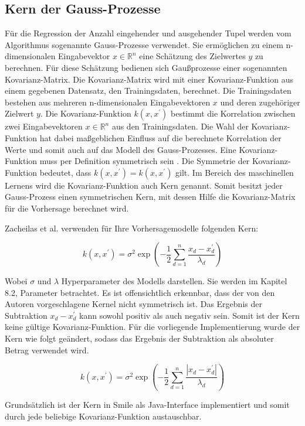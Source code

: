 \subsection{Kern der Gauss-Prozesse}
Für die Regression der Anzahl eingehender und ausgehender Tupel werden vom Algorithmus sogenannte Gauss-Prozesse verwendet.
Sie ermöglichen zu einem n-dimensionalen Eingabevektor \(x \in \mathbb{R}^n\) eine Schätzung des Zielwertes \(y\) zu berechnen.
Für diese Schätzung bedienen sich Gaußprozesse einer sogenannten Kovarianz-Matrix.
Die Kovarianz-Matrix wird mit einer Kovarianz-Funktion aus einem gegebenen Datensatz, den Trainingsdaten, berechnet.
Die Trainingsdaten bestehen aus mehreren n-dimensionalen Eingabevektoren \(x\) und deren zugehöriger Zielwert \(y\).
Die Kovarianz-Funktion \(k(x,x^\prime)\) bestimmt die Korrelation zwischen zwei Eingabevektoren \(x \in \mathbb{R}^n\) aus den Trainingsdaten.
Die Wahl der Kovarianz-Funktion hat dabei maßgeblichen Einfluss auf die berechnete Korrelation der Werte und somit auch auf das Modell des Gauss-Prozesses.
Eine Kovarianz-Funktion muss per Definition symmetrisch sein \cite{rasmussen2004gaussian}.
Die Symmetrie der Kovarianz-Funktion bedeutet, dass \(k(x,x^\prime) = k(x,x^\prime)\) gilt.
Im Bereich des maschinellen Lernens wird die Kovarianz-Funktion auch Kern genannt.
Somit besitzt jeder Gauss-Prozess einen symmetrischen Kern, mit dessen Hilfe die Kovarianz-Matrix für die Vorhersage berechnet wird.

Zacheilas et al. verwenden für Ihre Vorhersagemodelle folgenden Kern:

\[k(x, x^\prime) = \sigma^2 \exp{\left( - \frac{1}{2} \sum^{n}_{d=1} \frac{x_d-x_{d}^{\prime}}{\lambda_d}\right)}\]

Wobei \(\sigma\) und \(\lambda\) Hyperparameter des Modells darstellen.
Sie werden im Kapitel 8.2, Parameter betrachtet.
Es ist offensichtlich erkennbar, dass der von den Autoren vorgeschlagene Kernel nicht symmetrisch ist.
Das Ergebnis der Subtraktion \(x_d - x^\prime_d\) kann sowohl positiv als auch negativ sein.
Somit ist der Kern keine gültige Kovarianz-Funktion.
Für die vorliegende Implementierung wurde der Kern wie folgt geändert, sodass das Ergebnis der Subtraktion als absoluter Betrag verwendet wird.


\[k(x, x^\prime) = \sigma^2 \exp{\left( - \frac{1}{2} \sum^{n}_{d=1} \frac{|x_d-x_{d}^{\prime}|}{\lambda_d}\right)}\]

Grundsätzlich ist der Kern in Smile als Java-Interface implementiert und somit durch jede beliebige Kovarianz-Funktion austauschbar.

